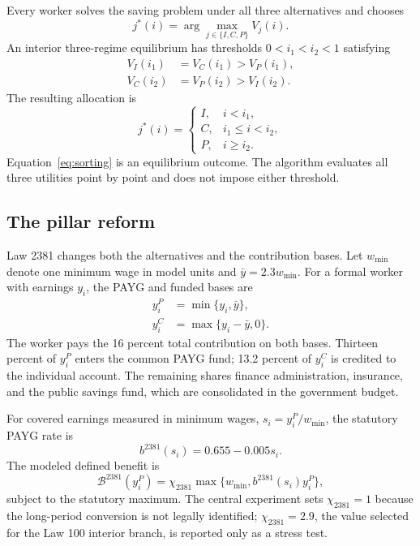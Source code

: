 \documentclass[12pt]{article}
\newcommand{\1}{\mathbf{1}}
\begin{document}
Every worker solves the saving problem under all three alternatives and chooses
\begin{equation}
j^*(i)=\arg\max_{j\in\{I,C,P\}}V_j(i).
\label{eq:choice}
\end{equation}
An interior three-regime equilibrium has thresholds $0<i_1<i_2<1$ satisfying
\begin{align}
V_I(i_1)&=V_C(i_1)>V_P(i_1),\\
V_C(i_2)&=V_P(i_2)>V_I(i_2).
\end{align}
The resulting allocation is
\begin{equation}
j^*(i)=
\begin{cases}
I,&i<i_1,\\
C,&i_1\leq i<i_2,\\
P,&i\geq i_2.
\end{cases}
\label{eq:sorting}
\end{equation}
Equation~\eqref{eq:sorting} is an equilibrium outcome. The algorithm evaluates all three
utilities point by point and does not impose either threshold.

\subsection{The pillar reform}

Law 2381 changes both the alternatives and the contribution bases. Let $w_{\min}$ denote one
minimum wage in model units and $\bar y=2.3w_{\min}$. For a formal worker with earnings $y_i$,
the PAYG and funded bases are
\begin{align}
y_i^{P}&=\min\{y_i,\bar y\},\\
y_i^{C}&=\max\{y_i-\bar y,0\}.
\label{eq:pillarbases}
\end{align}
The worker pays the 16 percent total contribution on both bases. Thirteen percent of $y_i^P$
enters the common PAYG fund; 13.2 percent of $y_i^C$ is credited to the individual account.
The remaining shares finance administration, insurance, and the public savings fund, which are
consolidated in the government budget.

For covered earnings measured in minimum wages, $s_i=y_i^P/w_{\min}$, the statutory PAYG rate is
\begin{equation}
b^{2381}(s_i)=0.655-0.005s_i.
\label{eq:pillarrate}
\end{equation}
The modeled defined benefit is
\begin{equation}
\mathcal B^{2381}(y_i^P)=
\chi_{2381}\max\{w_{\min},b^{2381}(s_i)y_i^P\},
\label{eq:pillarbenefit}
\end{equation}
subject to the statutory maximum. The central experiment sets $\chi_{2381}=1$ because the
long-period conversion is not legally identified; $\chi_{2381}=2.9$, the value selected for
the Law 100 interior branch, is reported only as a stress test.
\end{document}
